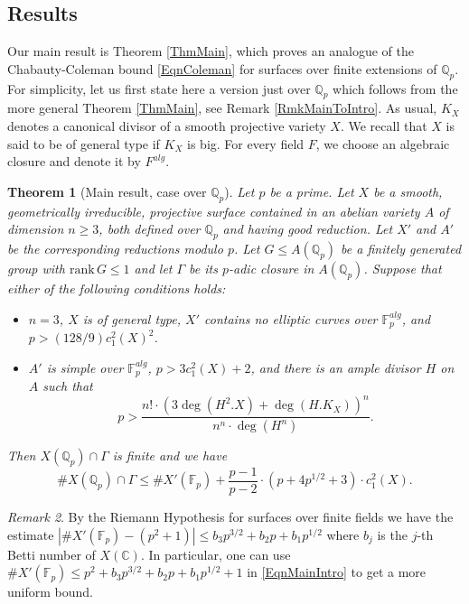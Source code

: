 \documentclass[11pt]{amsart}
\newtheorem{theorem}{Theorem}[section]
\theoremstyle{remark}
\newtheorem{remark}[theorem]{Remark}
\numberwithin{equation}{section}
\newcommand{\C}{\mathbb{C}}
\newcommand{\F}{\mathbb{F}}
\newcommand{\Q}{\mathbb{Q}}
\newcommand{\rk}{\mathrm{rank}\,}
\begin{document}

\subsection{Results}\label{SecIntroResults} Our main result is Theorem \ref{ThmMain}, which  proves an analogue of the Chabauty-Coleman bound  \eqref{EqnColeman} for surfaces over finite extensions of $\Q_p$. For simplicity, let us first state here a version just over $\Q_p$ which follows from the more general Theorem \ref{ThmMain}, see Remark \ref{RmkMainToIntro}. As usual, $K_X$ denotes a canonical divisor of a smooth projective variety $X$. We recall that $X$ is said to be  of general type if $K_X$ is big.  For every field $F$, we choose an algebraic closure and denote it by $F^{alg}$.
\begin{theorem}[Main result, case over $\Q_p$]\label{ThmMainIntro} Let $p$ be a prime. Let $X$ be a smooth, geometrically irreducible, projective surface contained in an abelian variety $A$ of dimension $n\ge 3$, both defined over $\Q_p$ and having good reduction. Let $X'$ and $A'$ be the corresponding reductions modulo $p$. Let $G\le A(\Q_p)$ be a finitely generated group with $\rk G\le 1$ and let $\Gamma$ be its $p$-adic closure in $A(\Q_p)$.  Suppose that either of the following conditions holds:
\begin{itemize}
\item[(i)] $n=3$, $X$ is of general type, $X'$ contains no elliptic curves over $\F_p^{alg}$, and $p>(128/9)c_1^2(X)^2$.  
\item[(ii)] $A'$ is simple over $\F_p^{alg}$, $p>3c_1^2(X)+2$, and there is an ample divisor $H$ on $A$ such that
$$
p> \frac{n!\cdot (3\deg(H^{2}.X) + \deg(H.K_X))^n}{n^n\cdot \deg(H^n)}.
$$
\end{itemize}
Then $X(\Q_p)\cap \Gamma$ is finite and we have
\begin{equation}\label{EqnMainIntro}
 \# X(\Q_p)\cap \Gamma\le \# X'(\F_p) + \frac{p-1}{p-2}\cdot \left(p+4p^{1/2} + 3\right)\cdot c_1^2(X).
 \end{equation}
\end{theorem}
\begin{remark}\label{RmkRHbd} By the Riemann Hypothesis for surfaces over finite fields \cite{Deligne} we have the estimate $|\# X'(\F_p) - (p^2+1)|\le b_3p^{3/2} + b_2 p+b_1p^{1/2}$ where $b_j$ is the $j$-th Betti number of $X(\C)$. In particular, one can use $\# X'(\F_p)\le p^2+b_3p^{3/2} + b_2 p+b_1p^{1/2}+1$  in \eqref{EqnMainIntro} to get a more uniform bound.
\end{remark}
\end{document}
